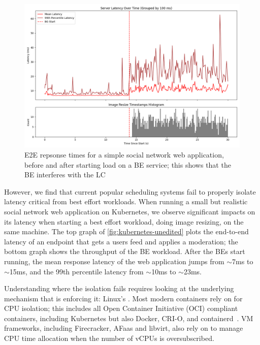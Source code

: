 \begin{figure}[t]
    \centering
    \includegraphics[width=\columnwidth]{graphs/kubernetes-unedited.png}
    \caption{E2E repsonse times for a simple social network web application,
    before and after starting load on a BE service; this shows that the BE
    interferes with the LC}\label{fig:kubernetes-unedited}
\end{figure}

However, we find that current popular scheduling systems fail to properly
isolate latency critical from best effort workloads. When running a small but
realistic social network web application on Kubernetes, we observe significant
impacts on its latency when starting a best effort workload, doing image
resizing, on the same machine. The top graph of
\autoref{fig:kubernetes-unedited} plots the end-to-end latency of an endpoint
that gets a users feed and applies a moderation; the bottom graph shows the
throughput of the BE workload. After the BEs start running, the mean response
latency of the web application jumps from $\sim$7ms to $\sim$15ms, and the 99th
percentile latency from $\sim$10ms to $\sim$23ms. 

Understanding where the isolation fails requires looking at the underlying
mechanism that is enforcing it: Linux's \cgroups{}. Most modern containers rely
on \cgroups{} for CPU isolation; this includes all Open Container Initiative
(OCI) compliant containers, including Kubernetes but also Docker, CRI-O, and
containerd~\cite{oci-cgroups,docker-docs-cgroups,container-isolation-article}.
VM frameworks, including Firecracker, AFaas and libvirt, also rely on \cgroups{}
to manage CPU time allocation when the number of vCPUs is
oversubscribed.~\cite{firecracker-cgroups,afaas,libvirt-cgroups}

